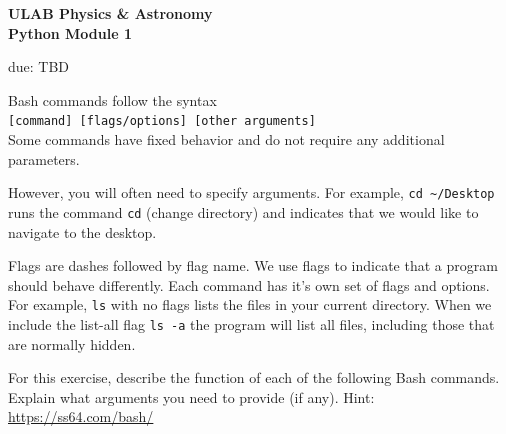 \documentclass[addpoints,12pt]{exam}
\numberwithin{equation}{section}
\begin{document}
	
	\begin{center}
		\textbf{\Large{ULAB Physics \& Astronomy\\Python Module 1}}
	\end{center}
	\begin{center}
		due: TBD
	\end{center}
	
	\begin{questions}
		
		\question[10] Bash commands follow the syntax \\\verb|[command] [flags/options] [other arguments]|\\Some commands have fixed behavior and do not require any additional parameters. 
		
		However, you will often need to specify arguments. For example, \verb|cd ~/Desktop| runs the command \verb|cd| (change directory) and indicates that we would like to navigate to the desktop. 
		
		Flags are dashes followed by flag name. We use flags to indicate that a program should behave differently. Each command has it's own set of flags and options. For example, \verb|ls| with no flags lists the files in your current directory. When we include the list-all flag  \verb|ls -a| the program will list all files, including those that are normally hidden.
		
		
		For this exercise, describe the function of each of the following Bash commands. Explain what arguments you need to provide (if any). Hint: \hyperref{https://ss64.com/bash/}{}{}{https://ss64.com/bash/}
		
\end{questions}
\end{document}
